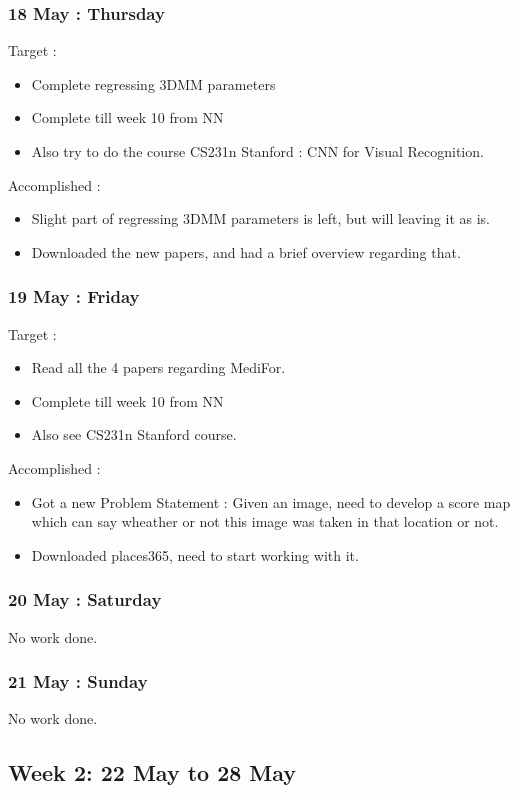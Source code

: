 \documentclass{article}
\begin{document}
\subsubsection{18 May : Thursday}
Target :
\begin{itemize}
\item Complete regressing 3DMM parameters
\item Complete till week 10 from NN
\item Also try to do the course CS231n Stanford : CNN for Visual Recognition. 
\end{itemize}
Accomplished :
\begin{itemize}
\item Slight part of regressing 3DMM parameters is left, but will leaving it as is.
\item Downloaded the new papers, and had a brief overview regarding that.
\end{itemize}

\subsubsection{19 May : Friday}
Target :
\begin{itemize}
\item Read all the  4 papers regarding MediFor.
\item Complete till week 10 from NN
\item Also see CS231n Stanford course.
\end{itemize}

Accomplished :
\begin{itemize}
\item Got a new Problem Statement :
  Given an image, need to develop a score map which can say wheather or not this image was taken in that location or not.
\item Downloaded places365, need to start working with it.
\end{itemize}

\subsubsection{20 May : Saturday}
No work done.

\subsubsection{21 May : Sunday}
No work done.

\subsection{Week 2: 22 May to 28 May}
\end{document}
